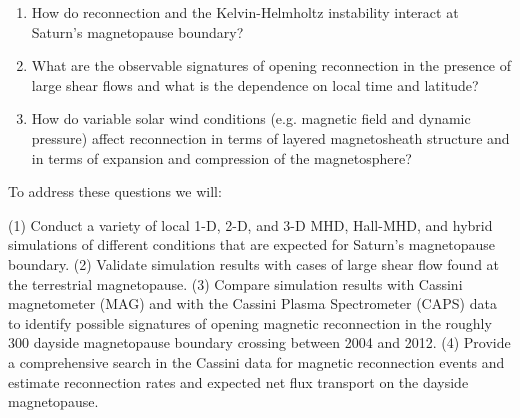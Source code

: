 \documentclass[indentfirst,12pt,letterpaper]{article}
\begin{document}
 {\em
\begin{enumerate}
\item{ How do reconnection and the Kelvin-Helmholtz instability  interact at Saturn's
    magnetopause boundary?}
\item{What are the observable signatures of opening reconnection in
    the presence of large shear flows and what is the dependence on
    local time and latitude?}
\item{How do variable solar wind conditions (e.g. magnetic field and
    dynamic pressure) affect reconnection in
    terms of layered magnetosheath structure and in terms of expansion and
    compression of the magnetosphere?}
\end{enumerate}
}

To address these questions we will:

(1) Conduct a variety of local 1-D, 2-D, and 3-D MHD, Hall-MHD, and hybrid
simulations of different conditions that are expected for Saturn's
magnetopause boundary.
(2) Validate simulation results with cases of
  large shear flow found at the terrestrial magnetopause.
(3) Compare simulation results with Cassini
  magnetometer (MAG)  and with the Cassini Plasma
  Spectrometer (CAPS) data to identify possible signatures of opening
  magnetic reconnection in the roughly 300 dayside magnetopause boundary crossing between 2004 and 2012.
(4) Provide a comprehensive search in the Cassini data for magnetic
reconnection events and estimate reconnection rates and expected net flux
transport on the dayside magnetopause.
\end{document}
